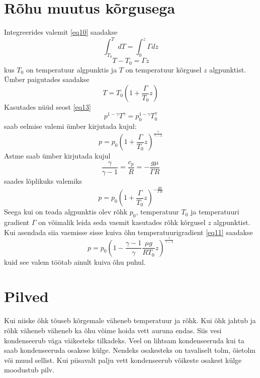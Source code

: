 \documentclass{trkut}%
\begin{document}
\section{Rõhu muutus kõrgusega }
Integreerides valemit \ref{eq10} saadakse
\begin{equation*}
\int_{T_0}^{T} dT = \int_{0}^{z} \Gamma dz
\end{equation*}
\begin{equation*}
T-T_0 = \Gamma z
\end{equation*}
kus $T_0$ on temperatuur algpunktis ja $T$ on temperatuur kõrgusel $z$ algpunktist. Ümber paigutades saadakse
\begin{equation*}
T = T_0 \left(1+\frac{\Gamma}{T_0}z\right)
\end{equation*}
Kasutades nüüd seost \ref{eq13}
\begin{equation*}
p^{1-\gamma}T^{\gamma} = p_0^{1-\gamma}T_0^{\gamma}
\end{equation*}
saab eelmise valemi ümber kirjutada kujul:
\begin{equation*}
p=p_0 \left(1+\frac{\Gamma}{T_0}z\right)^{\frac{\gamma}{\gamma-1}}
\end{equation*}
Astme saab ümber kirjutada kujul
\begin{equation*}
\frac{\gamma}{\gamma-1} = \frac{c_p}{R} = -\frac{g\mu}{\Gamma R}
\end{equation*}
saades lõplikuks valemiks
\begin{equation*}
p=p_0 \left(1+\frac{\Gamma}{T_0}z\right)^{ -\frac{g\mu}{\Gamma R}}
\end{equation*}
Seega kui on teada algpunktis olev rõhk $p_0$, temperatuur $T_0$ ja temperatuuri gradient $\Gamma$ on võimalik leida seda vaemit kasutades rõhk kõrgusel $z$ algpunktist. Kui asendada siia vaemisse sisse kuiva õhu temperatuurigradient \ref{eq11} saadakse
\begin{equation*}
p=p_0 \left(1-\frac{\gamma-1}{\gamma}\frac{\mu g}{RT_0}z\right)^{\frac{\gamma}{\gamma-1}}
\end{equation*}
kuid see valem töötab ainult kuiva õhu puhul.



\section{Pilved}
Kui niiske õhk tõuseb kõrgemale väheneb temperatuur ja rõhk. Kui õhk jahtub ja rõhk väheneb väheneb ka õhu võime hoida vett auruna endas. Siis vesi kondenseerub väga väikesteks tilkadeks. Veel on lihtsam kondenseeruda kui ta saab kondenseeruda osakese külge. Nendeks osakesteks on tavaliselt tolm, õietolm või muud sellist. Kui piisavalt palju vett kondenseerub võikeste osakest külge moodustub pilv.
\end{document}
